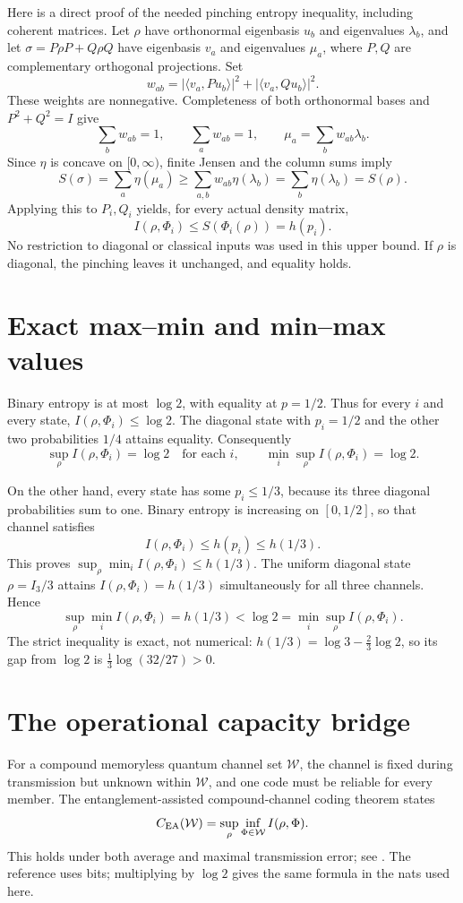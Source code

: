 \documentclass[11pt]{article}
\begin{document}
Here is a direct proof of the needed pinching entropy
inequality, including coherent matrices. Let $\rho$ have
orthonormal eigenbasis $u_b$ and eigenvalues $\lambda_b$,
and let $\sigma=P\rho P+Q\rho Q$ have eigenbasis $v_a$
and eigenvalues $\mu_a$, where $P,Q$ are complementary
orthogonal projections. Set
\[
 w_{ab}=|\langle v_a,Pu_b\rangle|^2
                    +|\langle v_a,Qu_b\rangle|^2.
\]
These weights are nonnegative. Completeness of both
orthonormal bases and $P^2+Q^2=I$ give
\[
 \sum_b w_{ab}=1,\qquad \sum_a w_{ab}=1,
             \qquad \mu_a=\sum_b w_{ab}\lambda_b.
\]
Since $\eta$ is concave on $[0,\infty)$, finite Jensen
and the column sums imply
\[
 S(\sigma)=\sum_a\eta(\mu_a)
    \geq\sum_{a,b}w_{ab}\eta(\lambda_b)
    =\sum_b\eta(\lambda_b)=S(\rho).
\]
Applying this to $P_i,Q_i$ yields, for every actual
density matrix,
\[
          I(\rho,\Phi_i)\leq S(\Phi_i(\rho))=h(p_i).
\]
No restriction to diagonal or classical inputs was
used in this upper bound. If $\rho$ is diagonal,
the pinching leaves it unchanged, and equality holds.

\newpage
\section*{Exact max--min and min--max values}
Binary entropy is at most $\log2$, with equality at
$p=1/2$. Thus for every $i$ and every state,
$I(\rho,\Phi_i)\leq\log2$. The diagonal state with
$p_i=1/2$ and the other two probabilities $1/4$
attains equality. Consequently
\[
              \sup_\rho I(\rho,\Phi_i)=\log2
                        \quad\text{for each }i,
\qquad
              \min_i\sup_\rho I(\rho,\Phi_i)=\log2.
\]

On the other hand, every state has some $p_i\leq1/3$,
because its three diagonal probabilities sum to one.
Binary entropy is increasing on $[0,1/2]$, so that
channel satisfies
\[
                 I(\rho,\Phi_i)\leq h(p_i)\leq h(1/3).
\]
This proves $\sup_\rho\min_i I(\rho,\Phi_i)\leq h(1/3)$.
The uniform diagonal state $\rho=I_3/3$ attains
$I(\rho,\Phi_i)=h(1/3)$ simultaneously for all three
channels. Hence
\[
        \sup_\rho\min_i I(\rho,\Phi_i)=h(1/3)<\log2
                             =\min_i\sup_\rho I(\rho,\Phi_i).
\]
The strict inequality is exact, not numerical:
$h(1/3)=\log3-\tfrac23\log2$, so its gap from
$\log2$ is $\tfrac13\log(32/27)>0$.

\section*{The operational capacity bridge}
For a compound memoryless quantum channel set
$\mathcal W$, the channel is fixed during transmission
but unknown within $\mathcal W$, and one code must be
reliable for every member. The entanglement-assisted
compound-channel coding theorem states
\[
 C_{\rm EA}(\mathcal W)
       =\sup_\rho\inf_{\Phi\in\mathcal W}I(\rho,\Phi).
\]
This holds under both average and maximal transmission
error; see \cite[Theorem 1, equation (7)]{bjk}.
The reference uses bits; multiplying by $\log2$
gives the same formula in the nats used here.
\end{document}
